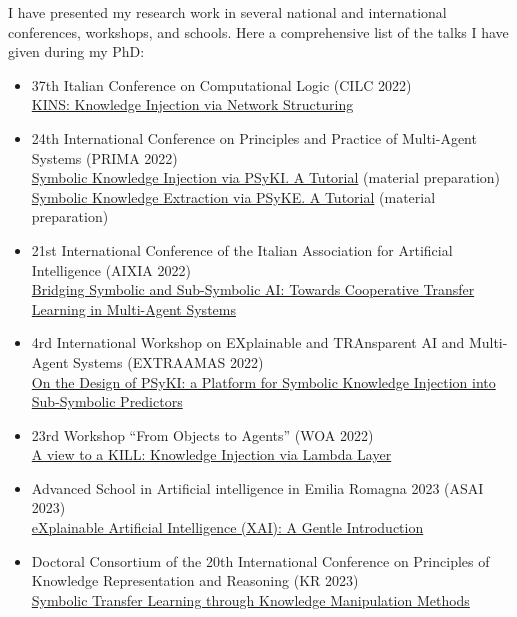 \documentclass[11pt]{article}
\begin{document}
I have presented my research work in several national and international conferences, workshops, and schools.
%
Here a comprehensive list of the talks I have given during my PhD:
%
\begin{itemize}
	\item 37th Italian Conference on Computational Logic (CILC 2022)
	\\\href{https://apice.unibo.it/xwiki/bin/view/Talk/KinsCilc2022}{KINS: Knowledge Injection via Network Structuring}
	\item 24th International Conference on Principles and Practice of Multi-Agent Systems (PRIMA 2022)
	\\\href{https://apice.unibo.it/xwiki/bin/view/Talk/PsykitutorialPrima2022}{Symbolic Knowledge Injection via PSyKI. A Tutorial} (material preparation)
	\\\href{https://apice.unibo.it/xwiki/bin/view/Talk/PsykiPrima2022}{Symbolic Knowledge Extraction via PSyKE. A Tutorial} (material preparation)
	\item 21st International Conference of the Italian Association for Artificial Intelligence (AIXIA 2022)
	\\\href{https://apice.unibo.it/xwiki/bin/view/Talk/CtlAixia2022}{Bridging Symbolic and Sub-Symbolic AI: Towards Cooperative Transfer Learning in Multi-Agent Systems}
	\item 4rd International Workshop on EXplainable and TRAnsparent AI and Multi-Agent Systems (EXTRAAMAS 2022)
	\\\href{https://apice.unibo.it/xwiki/bin/view/Talk/PsykiExtraamas2022}{On the Design of PSyKI: a Platform for Symbolic Knowledge Injection into Sub-Symbolic Predictors}
	\item 23rd Workshop ``From Objects to Agents'' (WOA 2022)
	\\\href{https://apice.unibo.it/xwiki/bin/view/Talk/KillWoa2022}{A view to a KILL: Knowledge Injection via Lambda Layer}
	\item Advanced School in Artificial intelligence in Emilia Romagna 2023 (ASAI 2023)
	\\\href{https://apice.unibo.it/xwiki/bin/view/Talk/XaiAsaiErBertinoro2023}{eXplainable Artificial Intelligence (XAI): A Gentle Introduction}
	\item Doctoral Consortium of the 20th International Conference on Principles of Knowledge Representation and Reasoning (KR 2023)
	\\\href{https://apice.unibo.it/xwiki/bin/view/Talk/SymbolicTransferLearning}{Symbolic Transfer Learning through Knowledge Manipulation Methods}

\end{itemize}
\end{document}
